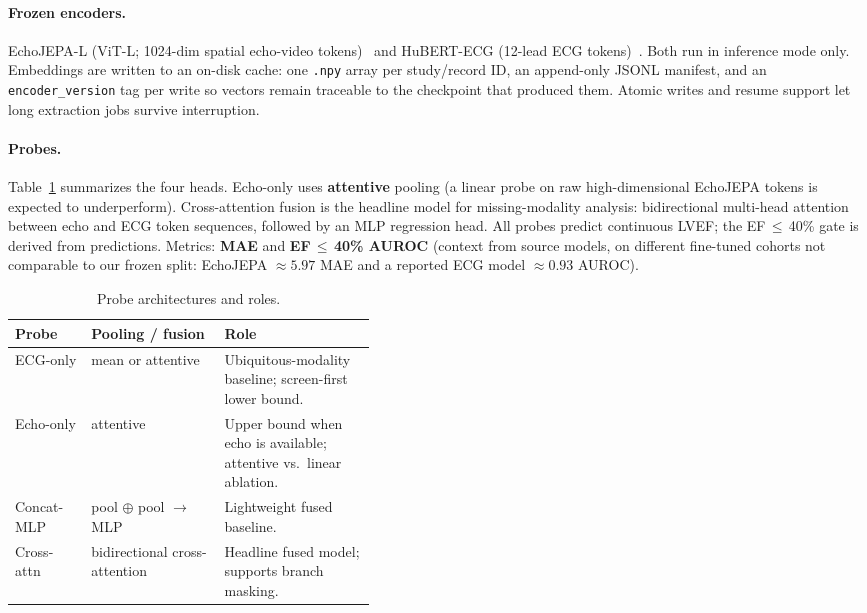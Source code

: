 \documentclass{article}
\begin{document}
\paragraph{Frozen encoders.} EchoJEPA-L (ViT-L; 1024-dim spatial echo-video
tokens)~\citep{echojepa} and HuBERT-ECG (12-lead ECG
tokens)~\citep{hubertecg}. Both run in inference mode only. Embeddings are written to an on-disk
cache: one \texttt{.npy} array per study/record ID, an append-only JSONL manifest, and an
\texttt{encoder\_version} tag per write so vectors remain traceable to the checkpoint that
produced them. Atomic writes and resume support let long extraction jobs survive interruption.

\paragraph{Probes.} Table~\ref{tab:probes} summarizes the four heads. Echo-only uses
\textbf{attentive} pooling (a linear probe on raw high-dimensional EchoJEPA tokens is expected
to underperform). Cross-attention fusion is the headline model for missing-modality analysis:
bidirectional multi-head attention between echo and ECG token sequences, followed by an MLP
regression head. All probes predict continuous LVEF; the \mbox{EF\,$\leq$\,40\%} gate is derived
from predictions. Metrics: \textbf{MAE} and \textbf{EF\,$\leq$\,40\% AUROC} (context from source
models, on different fine-tuned cohorts not comparable to our frozen split: EchoJEPA $\approx 5.97$ MAE and a reported ECG model $\approx 0.93$ AUROC).

\begin{table}[t]
\centering
\caption{Probe architectures and roles.}
\label{tab:probes}
\small
\begin{tabular}{@{}llp{0.42\linewidth}@{}}
\toprule
\textbf{Probe} & \textbf{Pooling / fusion} & \textbf{Role} \\
\midrule
ECG-only & mean or attentive & Ubiquitous-modality baseline; screen-first lower bound. \\
Echo-only & attentive & Upper bound when echo is available; attentive vs.\ linear ablation. \\
Concat-MLP & pool $\oplus$ pool $\rightarrow$ MLP & Lightweight fused baseline. \\
Cross-attn & bidirectional cross-attention & Headline fused model; supports branch masking. \\
\bottomrule
\end{tabular}
\end{table}
\end{document}
